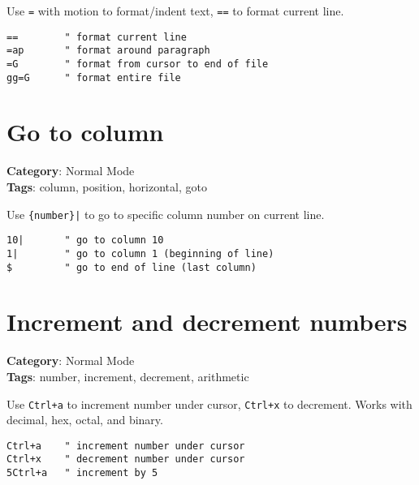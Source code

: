 {{{{{{{{{{Use {\footnotesize \Verb§=§} with motion to format/indent text, {\footnotesize \Verb§==§} to format current line.

\begin{Exa*}{}
\begin{Verbatim}[fontsize=\footnotesize, breaklines, breakanywhere]
==        " format current line
=ap       " format around paragraph
=G        " format from cursor to end of file
gg=G      " format entire file
\end{Verbatim}
\end{Exa*}

\section{Go to column}

\textbf{Category}: Normal Mode\\ \textbf{Tags}: column, position, horizontal, goto
\vspace{0.5cm}

Use {\footnotesize \Verb§{number}|§} to go to specific column number on current line.

\begin{Exa*}{}
\begin{Verbatim}[fontsize=\footnotesize, breaklines, breakanywhere]
10|       " go to column 10
1|        " go to column 1 (beginning of line)
$         " go to end of line (last column)
\end{Verbatim}
\end{Exa*}

\section{Increment and decrement numbers}

\textbf{Category}: Normal Mode\\ \textbf{Tags}: number, increment, decrement, arithmetic
\vspace{0.5cm}

Use {\footnotesize \Verb§Ctrl+a§} to increment number under cursor, {\footnotesize \Verb§Ctrl+x§} to decrement. Works with decimal, hex, octal, and binary.

\begin{Exa*}{}
\begin{Verbatim}[fontsize=\footnotesize, breaklines, breakanywhere]
Ctrl+a    " increment number under cursor
Ctrl+x    " decrement number under cursor
5Ctrl+a   " increment by 5
\end{Verbatim}
\end{Exa*}

}}}}}}}}}}
